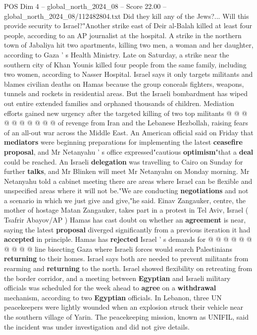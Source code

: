 \begin{textsample}{POS Dim 4 – global\_north\_2024\_08 – Score 22.00 – global\_north\_2024\_08/112482804.txt}
Did they kill any of the Jews?...
Will this provide security to Israel?"Another strike east of Deir al-Balah killed at least four people, according to an AP journalist at the hospital.
A strike in the northern town of Jabaliya hit two apartments, killing two men, a woman and her daughter, according to Gaza ' s Health Ministry.
Late on Saturday, a strike near the southern city of Khan Younis killed four people from the same family, including two women, according to Nasser Hospital.
Israel says it only targets militants and blames civilian deaths on Hamas because the group conceals fighters, weapons, tunnels and rockets in residential areas.
But the Israeli bombardment has wiped out entire extended families and orphaned thousands of children.
Mediation efforts gained new urgency after the targeted killing of two top militants @ @ @ @ @ @ @ @ @ @ of revenge from Iran and the Lebanese Hezbollah, raising fears of an all-out war across the Middle East.
An American official said on Friday that \textbf{mediators} were beginning preparations for implementing the latest \textbf{ceasefire} \textbf{proposal}, and Mr Netanyahu ' s office expressed"cautious \textbf{optimism}"that a \textbf{deal} could be reached.
An Israeli \textbf{delegation} was travelling to Cairo on Sunday for further \textbf{talks}, and Mr Blinken will meet Mr Netanyahu on Monday morning.
Mr Netanyahu told a cabinet meeting there are areas where Israel can be flexible and unspecified areas where it will not be."We are conducting \textbf{negotiations} and not a scenario in which we just give and give,"he said.
Einav Zangauker, centre, the mother of hostage Matan Zangauker, takes part in a protest in Tel Aviv, Israel ( Tsafrir Abayov/AP ) Hamas has cast doubt on whether an \textbf{agreement} is near, saying the latest \textbf{proposal} diverged significantly from a previous iteration it had \textbf{accepted} in principle.
Hamas has \textbf{rejected} Israel ' s demands for @ @ @ @ @ @ @ @ @ @ line bisecting Gaza where Israeli forces would search Palestinians \textbf{returning} to their homes.
Israel says both are needed to prevent militants from rearming and \textbf{returning} to the north.
Israel showed flexibility on retreating from the border corridor, and a meeting between \textbf{Egyptian} and Israeli military officials was scheduled for the week ahead to \textbf{agree} on a \textbf{withdrawal} mechanism, according to two \textbf{Egyptian} officials.
In Lebanon, three UN peacekeepers were lightly wounded when an explosion struck their vehicle near the southern village of Yarin.
The peacekeeping mission, known as UNIFIL, said the incident was under investigation and did not give details.

\end{textsample}
